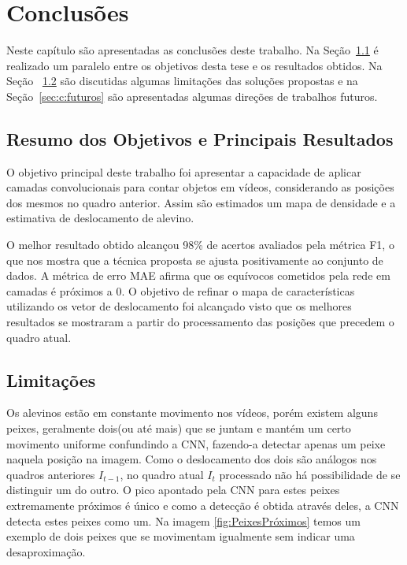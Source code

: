 \chapter{Conclusões}
\label{chap:conclusoes}

Neste capítulo são apresentadas as conclusões deste trabalho. Na
Seção~\ref{sec:c:resumo} é realizado um paralelo entre os objetivos desta tese
e os resultados obtidos. Na Seção~ \ref{sec:c:limitacoes} são discutidas
algumas limitações das soluções propostas e na Seção~\ref{sec:c:futuros} são
apresentadas algumas direções de trabalhos futuros.

\section{Resumo dos Objetivos e Principais Resultados}
\label{sec:c:resumo}

O objetivo principal deste trabalho foi apresentar a capacidade de aplicar camadas convolucionais para contar objetos em vídeos, considerando as posições dos mesmos no quadro anterior. Assim são estimados um mapa de densidade e a estimativa de deslocamento de alevino.

O melhor resultado obtido alcançou 98\% de acertos avaliados pela métrica F1, o que nos mostra que a técnica proposta se ajusta positivamente ao conjunto de dados. A métrica de erro MAE afirma que os equívocos cometidos pela rede em camadas é próximos a 0.
O objetivo de refinar o mapa de características utilizando os vetor de deslocamento foi alcançado visto que os melhores resultados se mostraram a partir do processamento das posições que precedem o quadro atual. 

\section{Limitações}
\label{sec:c:limitacoes}

Os alevinos estão em constante movimento nos vídeos, porém existem alguns peixes, geralmente dois(ou até mais) que se juntam e mantém um certo movimento uniforme confundindo a CNN, fazendo-a detectar apenas um peixe naquela posição na imagem. Como o deslocamento dos dois são análogos nos quadros anteriores $I_{t-1}$, no quadro atual $I_{t}$ processado não há possibilidade de se distinguir um do outro. O pico apontado pela CNN para estes peixes extremamente próximos é único e como a detecção é obtida através deles, a CNN detecta estes peixes como um. Na imagem \ref{fig:PeixesPróximos} temos um exemplo de dois peixes que se movimentam igualmente sem indicar uma desaproximação.

